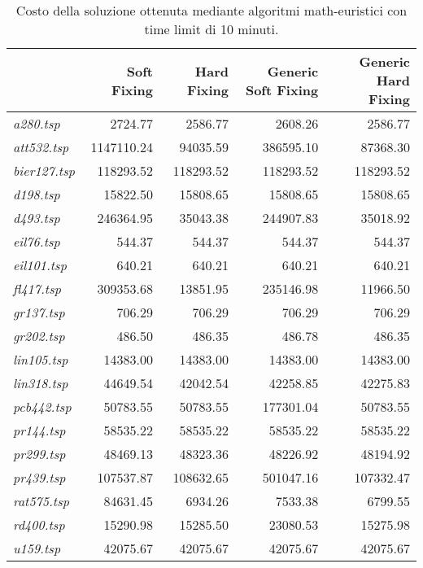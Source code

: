{\footnotesize
\begin{longtable}[H]{lrrrr}
\caption{Costo della soluzione ottenuta mediante algoritmi math-euristici con time limit di 10 minuti.}\\
\hline
{} & \textbf{Soft Fixing} & \textbf{Hard Fixing} & \textbf{Generic Soft Fixing} & \textbf{Generic Hard Fixing}\\
\hline
\textit{a280.tsp} & 2724.77 & 2586.77 & 2608.26 & 2586.77\\
\textit{att532.tsp} & 1147110.24 & 94035.59 & 386595.10 & 87368.30\\
\textit{bier127.tsp} & 118293.52 & 118293.52 & 118293.52 & 118293.52\\
\textit{d198.tsp} & 15822.50 & 15808.65 & 15808.65 & 15808.65\\
\textit{d493.tsp} & 246364.95 & 35043.38 & 244907.83 & 35018.92\\
\textit{eil76.tsp} & 544.37 & 544.37 & 544.37 & 544.37\\
\textit{eil101.tsp} & 640.21 & 640.21 & 640.21 & 640.21\\
\textit{fl417.tsp} & 309353.68 & 13851.95 & 235146.98 & 11966.50\\
\textit{gr137.tsp} & 706.29 & 706.29 & 706.29 & 706.29\\
\textit{gr202.tsp} & 486.50 & 486.35 & 486.78 & 486.35\\
\textit{lin105.tsp} & 14383.00 & 14383.00 & 14383.00 & 14383.00\\
\textit{lin318.tsp} & 44649.54 & 42042.54 & 42258.85 & 42275.83\\
\textit{pcb442.tsp} & 50783.55 & 50783.55 & 177301.04 & 50783.55\\
\textit{pr144.tsp} & 58535.22 & 58535.22 & 58535.22 & 58535.22\\
\textit{pr299.tsp} & 48469.13 & 48323.36 & 48226.92 & 48194.92\\
\textit{pr439.tsp} & 107537.87 & 108632.65 & 501047.16 & 107332.47\\
\textit{rat575.tsp} & 84631.45 & 6934.26 & 7533.38 & 6799.55\\
\textit{rd400.tsp} & 15290.98 & 15285.50 & 23080.53 & 15275.98\\
\textit{u159.tsp} & 42075.67 & 42075.67 & 42075.67 & 42075.67\\
\hline
\end{longtable}
}

